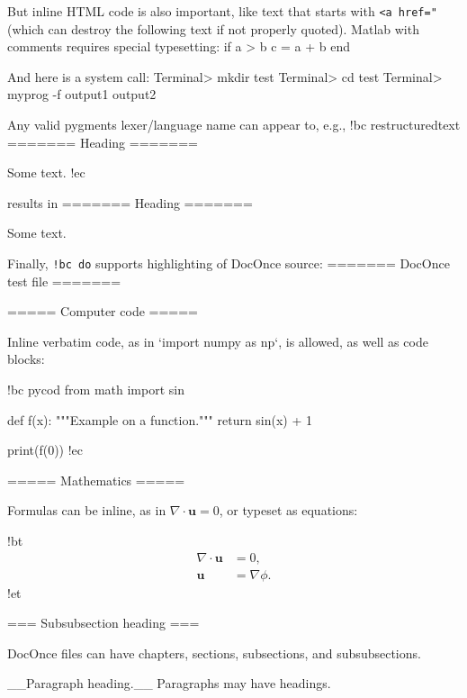 \documentclass[%
oneside,                 %
final,                   %
10pt]{article}
\theoremstyle{definition}
\begin{document}
\ehtmlcod

But inline HTML code is also important, like text that starts with
\texttt{<a href="} (which can destroy the following text if not properly
quoted).
Matlab with comments requires special typesetting:
\bmcod
if a > b
  c = a + b
end

\emcod

And here is a system call:
\bsys
Terminal> mkdir test
Terminal> cd test
Terminal> myprog -f
output1
output2

\esys

Any valid pygments lexer/language name can appear to, e.g.,
\bdo
!bc restructuredtext
=======
Heading
=======

Some text.
!ec

\edo

results in
\brestructuredtext
=======
Heading
=======

Some text.

\erestructuredtext

Finally, \Verb?!bc do? supports highlighting of DocOnce source:
\bdo
======= DocOnce test file =======

===== Computer code =====

Inline verbatim code, as in `import numpy as np`, is allowed, as well as
code blocks:

!bc pycod
from math import sin

def f(x):
    """Example on a function."""
    return sin(x) + 1

print(f(0))
!ec


===== Mathematics =====

Formulas can be inline, as in $\nabla\cdot\bm{u} = 0$, or typeset
as equations:

!bt
\begin{align*}
\nabla\cdot\bm{u} &= 0,\\ 
\bm{u} &= \nabla\phi .
\end{align*}
!et

=== Subsubsection heading ===

DocOnce files can have chapters, sections, subsections, and subsubsections.

__Paragraph heading.__ Paragraphs may have headings.

\edo
\end{document}
